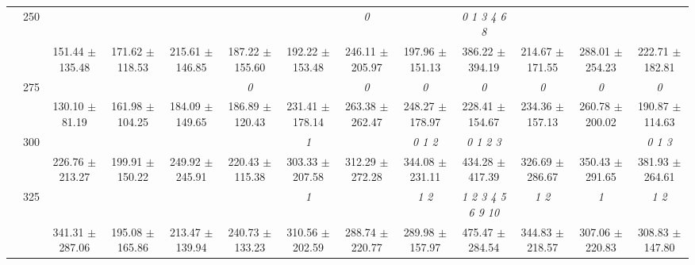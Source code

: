 \begin{table}[h]
{\begin{tabular}{
        ccccccccccccc}
 & \multirow{2}{*}{250}& & & & & & \textit{ 0 }& & \textit{ 0 1 3 4 6 8 }& & &  \\ 
 & & 151.44 $\pm$ 135.48& 171.62 $\pm$ 118.53& 215.61 $\pm$ 146.85& 187.22 $\pm$ 155.60& 192.22 $\pm$ 153.48& 246.11 $\pm$ 205.97& 197.96 $\pm$ 151.13& 386.22 $\pm$ 394.19& 214.67 $\pm$ 171.55& 288.01 $\pm$ 254.23& 222.71 $\pm$ 182.81 \\ 
 & \multirow{2}{*}{275}& \cellcolor[HTML]{EFEFEF} & \cellcolor[HTML]{EFEFEF} & \cellcolor[HTML]{EFEFEF} & \cellcolor[HTML]{EFEFEF} \textit{ 0 }& \cellcolor[HTML]{EFEFEF} & \cellcolor[HTML]{EFEFEF} \textit{ 0 }& \cellcolor[HTML]{EFEFEF} \textit{ 0 }& \cellcolor[HTML]{EFEFEF} \textit{ 0 }& \cellcolor[HTML]{EFEFEF} \textit{ 0 }& \cellcolor[HTML]{EFEFEF} \textit{ 0 }& \cellcolor[HTML]{EFEFEF} \textit{ 0 } \\ 
 & & \cellcolor[HTML]{EFEFEF} 130.10 $\pm$ 81.19& \cellcolor[HTML]{EFEFEF} 161.98 $\pm$ 104.25& \cellcolor[HTML]{EFEFEF} 184.09 $\pm$ 149.65& \cellcolor[HTML]{EFEFEF} 186.89 $\pm$ 120.43& \cellcolor[HTML]{EFEFEF} 231.41 $\pm$ 178.14& \cellcolor[HTML]{EFEFEF} 263.38 $\pm$ 262.47& \cellcolor[HTML]{EFEFEF} 248.27 $\pm$ 178.97& \cellcolor[HTML]{EFEFEF} 228.41 $\pm$ 154.67& \cellcolor[HTML]{EFEFEF} 234.36 $\pm$ 157.13& \cellcolor[HTML]{EFEFEF} 260.78 $\pm$ 200.02& \cellcolor[HTML]{EFEFEF} 190.87 $\pm$ 114.63 \\ 
 & \multirow{2}{*}{300}& & & & & \textit{ 1 }& & \textit{ 0 1 2 }& \textit{ 0 1 2 3 }& & & \textit{ 0 1 3 } \\ 
 & & 226.76 $\pm$ 213.27& 199.91 $\pm$ 150.22& 249.92 $\pm$ 245.91& 220.43 $\pm$ 115.38& 303.33 $\pm$ 207.58& 312.29 $\pm$ 272.28& 344.08 $\pm$ 231.11& 434.28 $\pm$ 417.39& 326.69 $\pm$ 286.67& 350.43 $\pm$ 291.65& 381.93 $\pm$ 264.61 \\ 
 & \multirow{2}{*}{325}& \cellcolor[HTML]{EFEFEF} & \cellcolor[HTML]{EFEFEF} & \cellcolor[HTML]{EFEFEF} & \cellcolor[HTML]{EFEFEF} & \cellcolor[HTML]{EFEFEF} \textit{ 1 }& \cellcolor[HTML]{EFEFEF} & \cellcolor[HTML]{EFEFEF} \textit{ 1 2 }& \cellcolor[HTML]{EFEFEF} \textit{  1  2  3  4  5  6  9 10 }& \cellcolor[HTML]{EFEFEF} \textit{ 1 2 }& \cellcolor[HTML]{EFEFEF} \textit{ 1 }& \cellcolor[HTML]{EFEFEF} \textit{ 1 2 } \\ 
 & & \cellcolor[HTML]{EFEFEF} 341.31 $\pm$ 287.06& \cellcolor[HTML]{EFEFEF} 195.08 $\pm$ 165.86& \cellcolor[HTML]{EFEFEF} 213.47 $\pm$ 139.94& \cellcolor[HTML]{EFEFEF} 240.73 $\pm$ 133.23& \cellcolor[HTML]{EFEFEF} 310.56 $\pm$ 202.59& \cellcolor[HTML]{EFEFEF} 288.74 $\pm$ 220.77& \cellcolor[HTML]{EFEFEF} 289.98 $\pm$ 157.97& \cellcolor[HTML]{EFEFEF} 475.47 $\pm$ 284.54& \cellcolor[HTML]{EFEFEF} 344.83 $\pm$ 218.57& \cellcolor[HTML]{EFEFEF} 307.06 $\pm$ 220.83& \cellcolor[HTML]{EFEFEF} 308.83 $\pm$ 147.80 \\ 

\end{tabular}}
\end{table}
